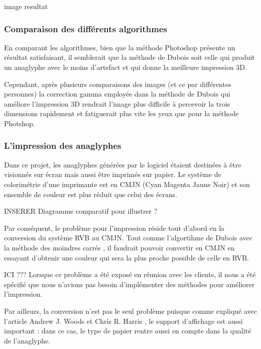 image resultat

\subsubsection{Comparaison des différents algorithmes}

En comparant les algorithmes, bien que la méthode Photoshop présente un résultat satisfaisant, il semblerait que la méthode de Dubois \cite{algoDubois}  soit celle qui produit un anaglyphe avec le moins d'artefact et qui donne la meilleure impression 3D. 

Cependant, après plusieurs comparaisons des images (et ce par différentes personnes) la correction gamma employée dans la méthode de Dubois qui améliore l'impression 3D rendrait l'image plus difficile à percevoir la trois dimensions rapidement et fatiguerait plus vite les yeux que pour la méthode Photshop.


\subsubsection{L'impression des anaglyphes}
Dans ce projet, les anaglyphes générées par le logiciel étaient destinées à être visionnés sur écran mais aussi être imprimés sur papier. Le système de colorimétrie d'une imprimante est en CMJN (Cyan Magenta Jaune Noir) et son ensemble de couleur est plus réduit que celui des écrans. 

INSERER Diagramme comparatif pour illustrer ?

Par conséquent, le problème pour l'impression réside tout d'abord en la conversion du système RVB au CMJN. Tout comme l'algortihme de Dubois avec la méthode des moindres carrés \cite{algoDubois}, il faudrait pouvoir convertir en CMJN en essayant d'obtenir une couleur qui sera la plus proche possible de celle en RVB. 

ICI ??? Lorsque ce problème a été exposé en réunion avec les clients, il nous a été spécifié que nous n'avions pas besoin d'implémenter des méthodes pour améliorer l'impression. 

Par ailleurs, la conversion n'est pas le seul problème puisque comme expliqué avec l'article Andrew J. Woods et Chris R. Harris \cite{anaglypheDefaut}, le support d'affichage est aussi important : dans ce cas, le type de papier rentre aussi en compte dans la qualité de l'anaglyphe. 
